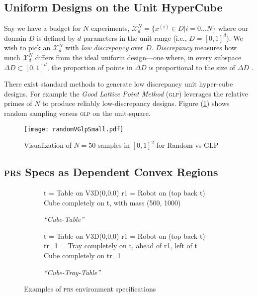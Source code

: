 \documentclass[sigplan, screen]{acmart} %
\newcommand{\expD}{\mathcal{X}^{N}_d}
\begin{document}
\subsection{Uniform Designs on the Unit HyperCube}

Say we have a budget for $N$ experiments, $\expD = \{ x^{(i)} \in D | i = 0 \dots N \}$ where our domain $D$ is defined by $d$ parameters in the unit range (i.e., $D = [0,1]^d$). We wish to pick an $\expD$ with \emph{low discrepancy} over $D$. \emph{Discrepancy} measures how much $\expD$ differs from the ideal uniform design---one where, in every subspace $\Delta D \subset [0, 1]^d$, the proportion of points in $\Delta D$ is proportional to the size of $\Delta D$ \cite{garud2017design}.

There exist standard methods to generate low discrepancy unit hyper-cube designs. For example the \emph{Good Lattice Point Method} (\textsc{glp}) \cite{zaremba1966good} leverages the relative primes of $N$ to produce reliably low-discrepancy designs. Figure (\ref{fig:hypercube-comparison}) shows random sampling versus \textsc{glp} on the unit-square.

\begin{figure}
    \centering
    \texttt{[image: randomVGlpSmall.pdf]}
    \caption{Visualization of $N=50$ samples in  $[0,1]^2$ for Random vs \textsc{GLP}}
    \label{fig:hypercube-comparison}
\end{figure}

\subsection{\textsc{prs} Specs as Dependent Convex Regions}

\begin{figure}
\begin{subfigure}{\linewidth}
    \centering
    \begin{LVerbatim}[fontsize=\footnotesize]
t = Table on V3D(0,0,0)
r1 = Robot on (top back t)
Cube completely on t, with mass (500, 1000)
    \end{LVerbatim}
    \caption{\emph{``Cube-Table''}}
    \label{fig:lang-examples:single}
\end{subfigure}

\begin{subfigure}{\linewidth}
    \centering
    \begin{LVerbatim}[fontsize=\footnotesize]
t = Table on V3D(0,0,0)
r1 = Robot on (top back t)
tr_1 = Tray completely on t, ahead of r1, left of t
Cube completely on tr_1
    \end{LVerbatim}
    \caption{\emph{``Cube-Tray-Table''}}
    \label{fig:lang-examples:dependent}
\end{subfigure}
\caption{Examples of \textsc{prs} environment specifications}
\label{fig:lang-examples}
\end{figure}
\end{document}
